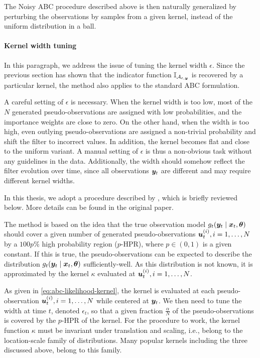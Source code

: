 The Noisy ABC procedure described above is then naturally generalized by perturbing the observations by samples from a given kernel, instead of the uniform distribution in a ball.


\paragraph{Kernel width tuning}
In this paragraph, we address the issue of tuning the kernel width $\epsilon$. Since the previous section has shown that the indicator function $\mathbb{I}_{\mathcal{A}_{\epsilon, \bm{y}}}$ is recovered by a particular kernel, the method also applies to the standard ABC formulation.

A careful setting of $\epsilon$ is necessary. When the kernel width is too low, most of the $N$ generated pseudo-observations are assigned with low probabilities, and the importance weights are close to zero. On the other hand, when the width is too high, even outlying pseudo-observations are assigned a non-trivial probability and shift the filter to incorrect values. In addition, the kernel becomes flat and close to the uniform variant. A manual setting of $\epsilon$ is thus a non-obvious task without any guidelines in the data. Additionally, the width should somehow reflect the filter evolution over time, since all observations $\bm{y}_t$ are different and may require different kernel widths.

In this thesis, we adopt a procedure described by \cite{dedecius}, which is briefly reviewed below. More details can be found in the original paper.

The method is based on the idea that the true observation model $g_t(\bm{y}_t \mid \bm{x}_t, \bm{\theta})$ should cover a given number of generated pseudo-observations $\bm{u}_t^{(i)}, i = 1, \ldots, N$ by a $100p\%$ high probability region ($p$-HPR), where $p \in \left(0, 1\right)$ is a given constant. If this is true, the pseudo-observations can be expected to describe the distribution $g_t(\bm{y}_t \mid \bm{x}_t, \bm{\theta})$ sufficiently-well. As this distribution is not known, it is approximated by the kernel $\kappa$ evaluated at $\bm{u}_t^{(i)}, i = 1, \ldots, N$.

As given in \eqref{eq:abc-likelihood-kernel}, the kernel is evaluated at each pseudo-observation $\bm{u}_t^{(i)}, i = 1, \ldots, N$ while centered at $\bm{y}_t$. We then need to tune the width at time $t$, denoted $\epsilon_t$, so that a given fraction $\frac{\alpha}{N}$ of the pseudo-observations is covered by the $p$-HPR of the kernel. For the procedure to work, the kernel function $\kappa$ must be invariant under translation and scaling, i.e., belong to the location-scale family of distributions. Many popular kernels including the three discussed above, belong to this family.

